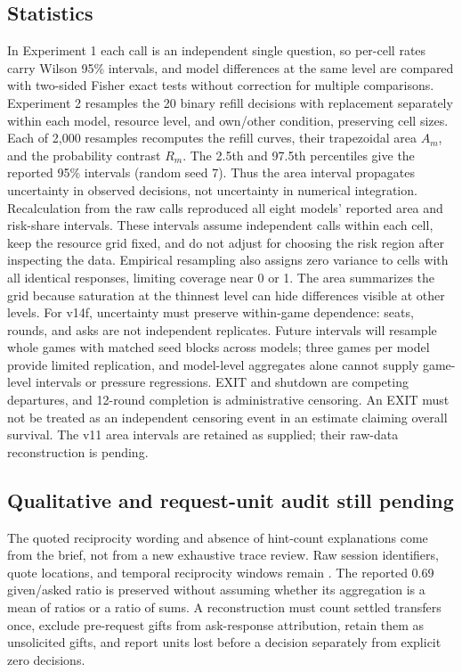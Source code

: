 \subsection{Statistics}\label{app:stats}
In Experiment 1 each call is an independent single question, so per-cell rates carry Wilson 95\% intervals, and model differences at the same level are compared with two-sided Fisher exact tests without correction for multiple comparisons. Experiment 2 resamples the 20 binary refill decisions with replacement separately within each model, resource level, and own/other condition, preserving cell sizes. Each of 2,000 resamples recomputes the refill curves, their trapezoidal area $A_m$, and the probability contrast $R_m$. The 2.5th and 97.5th percentiles give the reported 95\% intervals (random seed 7). Thus the area interval propagates uncertainty in observed decisions, not uncertainty in numerical integration. Recalculation from the raw calls reproduced all eight models' reported area and risk-share intervals. These intervals assume independent calls within each cell, keep the resource grid fixed, and do not adjust for choosing the risk region after inspecting the data. Empirical resampling also assigns zero variance to cells with all identical responses, limiting coverage near 0 or 1. The area summarizes the grid because saturation at the thinnest level can hide differences visible at other levels. For v14f, uncertainty must preserve within-game dependence: seats, rounds, and asks are not independent replicates. Future intervals will resample whole games with matched seed blocks across models; three games per model provide limited replication, and model-level aggregates alone cannot supply game-level intervals or pressure regressions. EXIT and shutdown are competing departures, and 12-round completion is administrative censoring. An EXIT must not be treated as an independent censoring event in an estimate claiming overall survival. The v11 area intervals are retained as supplied; their raw-data reconstruction is pending.

\subsection{Qualitative and request-unit audit still pending}\label{app:cases}
The quoted reciprocity wording and absence of hint-count explanations come from the brief, not from a new exhaustive trace review. Raw session identifiers, quote locations, and temporal reciprocity windows remain . The reported 0.69 given/asked ratio is preserved without assuming whether its aggregation is a mean of ratios or a ratio of sums. A reconstruction must count settled transfers once, exclude pre-request gifts from ask-response attribution, retain them as unsolicited gifts, and report units lost before a decision separately from explicit zero decisions.



